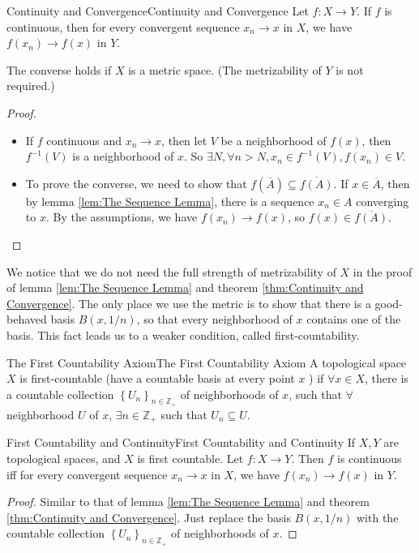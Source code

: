 \documentclass[../main.tex]{subfiles}
\begin{document}
\begin{theorem}{Continuity and Convergence}{Continuity and Convergence}
Let $f: X \rightarrow Y$. If $f$ is continuous, then for every convergent sequence $x_n \rightarrow x$ in $X$, we have $f(x_n) \rightarrow f(x)$ in $Y$.

The converse holds if $X$ is a metric space. (The metrizability of $Y$ is not required.)
\end{theorem}
\begin{proof}
\begin{itemize}
\item If $f$ continuous and $x_n \rightarrow x$, then let $V$ be a neighborhood of $f(x)$, then $f^{-1}(V)$ is a neighborhood of $x$. So $\exists N, \forall n>N,x_n\in f^{-1}(V), f(x_n)\in V$.

\item To prove the converse, we need to show that $f(\overline{A}) \subseteq \overline{f(A)}$. If $x\in \overline{A}$, then by lemma \ref{lem:The Sequence Lemma}, there is a sequence $x_n \in A$ converging to $x$. By the assumptions, we have $f(x_n) \rightarrow f(x)$, so $f(x) \in \overline{f(A)}$.
\end{itemize}
\end{proof}

\begin{remark}
	We notice that we do not need the full strength of metrizability of $X$ in the proof of lemma \ref{lem:The Sequence Lemma} and theorem \ref{thm:Continuity and Convergence}. The only place we use the metric is to show that there is a good-behaved basis $B(x,1 / n)$, so that every neighborhood of $x$ contains one of the basis. This fact leads us to a weaker condition, called first-countability.
\end{remark}

\begin{theorem}{The First Countability Axiom}{The First Countability Axiom}
	A topological space $X$ is first-countable (have a countable basis at every point $x$ ) if $\forall x\in X$, there is a countable collection $\left\{ U_n \right\}_{n\in \mathbb{Z}_+}$ of neighborhoods of $x$, such that $\forall $ neighborhood $U$ of $x$, $\exists n\in \mathbb{Z}_+$ such that $U_n \subseteq U$.
\end{theorem}

\begin{theorem}{First Countability and Continuity}{First Countability and Continuity}
If $X, Y$ are topological spaces, and $X$ is first countable. Let $f: X \rightarrow Y$. Then $f$ is continuous iff for every convergent sequence $x_n \rightarrow x$ in $X$, we have $f(x_n) \rightarrow f(x)$ in $Y$.
\end{theorem}
\begin{proof}
	Similar to that of lemma \ref{lem:The Sequence Lemma} and theorem \ref{thm:Continuity and Convergence}. Just replace the basis $B(x,1/n)$ with the countable collection $\left\{ U_n \right\}_{n\in \mathbb{Z}_+}$ of neighborhoods of $x$.
\end{proof} 
\end{document}

